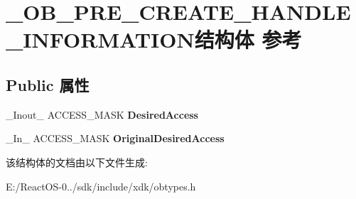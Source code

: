 \hypertarget{struct___o_b___p_r_e___c_r_e_a_t_e___h_a_n_d_l_e___i_n_f_o_r_m_a_t_i_o_n}{}\section{\+\_\+\+O\+B\+\_\+\+P\+R\+E\+\_\+\+C\+R\+E\+A\+T\+E\+\_\+\+H\+A\+N\+D\+L\+E\+\_\+\+I\+N\+F\+O\+R\+M\+A\+T\+I\+O\+N结构体 参考}
\label{struct___o_b___p_r_e___c_r_e_a_t_e___h_a_n_d_l_e___i_n_f_o_r_m_a_t_i_o_n}
\subsection*{Public 属性}
\begin{DoxyCompactItemize}
\item 
\mbox{\label{struct___o_b___p_r_e___c_r_e_a_t_e___h_a_n_d_l_e___i_n_f_o_r_m_a_t_i_o_n_a5e39e54b576ad744d528a4a1f4459e85}} 
\+\_\+\+Inout\+\_\+ A\+C\+C\+E\+S\+S\+\_\+\+M\+A\+SK {\bfseries Desired\+Access}
\item 
\mbox{\label{struct___o_b___p_r_e___c_r_e_a_t_e___h_a_n_d_l_e___i_n_f_o_r_m_a_t_i_o_n_ac9c46f5006d369ff5da327230518e136}} 
\+\_\+\+In\+\_\+ A\+C\+C\+E\+S\+S\+\_\+\+M\+A\+SK {\bfseries Original\+Desired\+Access}
\end{DoxyCompactItemize}


该结构体的文档由以下文件生成\+:\begin{DoxyCompactItemize}
\item 
E\+:/\+React\+O\+S-\/0../sdk/include/xdk/obtypes.\+h\end{DoxyCompactItemize}
